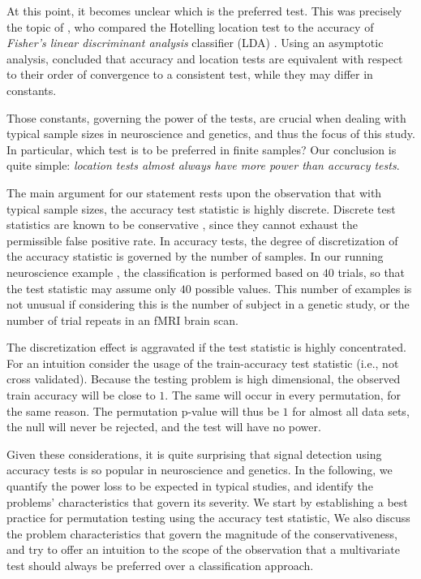 \documentclass[12pt,a4paper]{article}
\begin{document}
At this point, it becomes unclear which is the preferred test. 
This was precisely the topic of \cite{ramdas_classification_2016}, who compared the Hotelling location test to the accuracy of \emph{Fisher's linear discriminant analysis} classifier (LDA) \citep{hastie_elements_2003-1}. 
Using an asymptotic analysis, \cite{ramdas_classification_2016} concluded that accuracy and location tests are equivalent with respect to their order of convergence to a consistent test, while they may differ in constants. 

Those constants, governing the power of the tests, are crucial when dealing with typical sample sizes in neuroscience and genetics, and thus the focus of this study. 
In particular, which test is to be preferred in finite samples? 
Our conclusion is quite simple: {\em location tests almost always have more power than accuracy tests}.

The main argument for our statement rests upon the observation that with typical sample sizes, the accuracy test statistic is highly discrete. 
Discrete test statistics are known to be conservative \citep{hemerik_exact_2014-1}, since they cannot exhaust the permissible false positive rate. 
In accuracy tests, the degree of discretization of the accuracy statistic is governed by the number of samples. 
In our running neuroscience example \citep{gilron_quantifying_2016}, the classification is performed based on $40$ trials, so that the test statistic may assume only $40$ possible values. 
This number of examples is not unusual if considering this is the number of subject in a genetic study, or the number of trial repeats in an fMRI brain scan. 

The discretization effect is aggravated if the test statistic is highly concentrated. 
For an intuition consider the usage of the train-accuracy test statistic (i.e., not cross validated).
Because the testing problem is high dimensional, the observed train accuracy will be close to $1$. 
The same will occur in every permutation, for the same reason. 
The permutation p-value will thus be $1$ for almost all data sets, the null will never be rejected, and the test will have no power. 

Given these considerations, it is quite surprising that signal detection using accuracy tests is so popular in neuroscience and genetics. 
In the following, we quantify the power loss to be expected in typical studies, and identify the problems' characteristics that govern its severity. 
We start by establishing a best practice for permutation testing using the accuracy test statistic, 
We also discuss the problem characteristics that govern the magnitude of the conservativeness, and try to offer an intuition to the scope of the observation that a multivariate test should always be preferred over a classification approach. 
\end{document}
